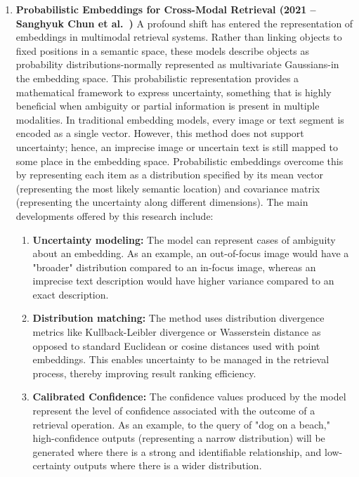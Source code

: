 \documentclass[conference]{IEEEtran}
\begin{document}
\begin{enumerate}
\item \textbf{Probabilistic Embeddings for Cross-Modal Retrieval (2021 – Sanghyuk Chun et al.~\cite{chun2021probabilistic})} 
A profound shift has entered the representation of embeddings in multimodal retrieval systems. Rather than linking objects to fixed positions in a semantic space, these models describe objects as probability distributions-normally represented as multivariate Gaussians-in the embedding space. This probabilistic representation provides a mathematical framework to express uncertainty, something that is highly beneficial when ambiguity or partial information is present in multiple modalities.
In traditional embedding models, every image or text segment is encoded as a single vector. However, this method does not support uncertainty; hence, an imprecise image or uncertain text is still mapped to some place in the embedding space. Probabilistic embeddings overcome this by representing each item as a distribution specified by its mean vector (representing the most likely semantic location) and covariance matrix (representing the uncertainty along different dimensions).
The main developments offered by this research include:

\begin{enumerate}
\item \textbf{Uncertainty modeling:} The model can represent cases of ambiguity about an embedding. As an example, an out-of-focus image would have a "broader" distribution compared to an in-focus image, whereas an imprecise text description would have higher variance compared to an exact description.
\item \textbf{Distribution matching:} The method uses distribution divergence metrics like Kullback-Leibler divergence or Wasserstein distance as opposed to standard Euclidean or cosine distances used with point embeddings. This enables uncertainty to be managed in the retrieval process, thereby improving result ranking efficiency.

\item \textbf{Calibrated Confidence:} The confidence values produced by the model represent the level of confidence associated with the outcome of a retrieval operation. As an example, to the query of "dog on a beach," high-confidence outputs (representing a narrow distribution) will be generated where there is a strong and identifiable relationship, and low-certainty outputs where there is a wider distribution.


\end{enumerate}
\end{enumerate}
\end{document}
